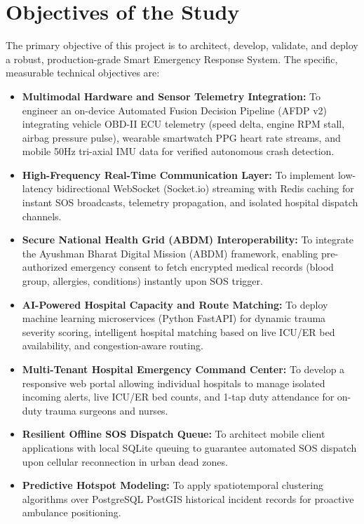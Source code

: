 \documentclass[12pt,a4paper]{article}
\begin{document}
\clearpage
\section{Objectives of the Study}
The primary objective of this project is to architect, develop, validate, and deploy a robust, production-grade Smart Emergency Response System. The specific, measurable technical objectives are:

\begin{itemize}
    \item \textbf{Multimodal Hardware and Sensor Telemetry Integration:} To engineer an on-device Automated Fusion Decision Pipeline (AFDP v2) integrating vehicle OBD-II ECU telemetry (speed delta, engine RPM stall, airbag pressure pulse), wearable smartwatch PPG heart rate streams, and mobile 50Hz tri-axial IMU data for verified autonomous crash detection.
    \item \textbf{High-Frequency Real-Time Communication Layer:} To implement low-latency bidirectional WebSocket (Socket.io) streaming with Redis caching for instant SOS broadcasts, telemetry propagation, and isolated hospital dispatch channels.
    \item \textbf{Secure National Health Grid (ABDM) Interoperability:} To integrate the Ayushman Bharat Digital Mission (ABDM) framework, enabling pre-authorized emergency consent to fetch encrypted medical records (blood group, allergies, conditions) instantly upon SOS trigger.
    \item \textbf{AI-Powered Hospital Capacity and Route Matching:} To deploy machine learning microservices (Python FastAPI) for dynamic trauma severity scoring, intelligent hospital matching based on live ICU/ER bed availability, and congestion-aware routing.
    \item \textbf{Multi-Tenant Hospital Emergency Command Center:} To develop a responsive web portal allowing individual hospitals to manage isolated incoming alerts, live ICU/ER bed counts, and 1-tap duty attendance for on-duty trauma surgeons and nurses.
    \item \textbf{Resilient Offline SOS Dispatch Queue:} To architect mobile client applications with local SQLite queuing to guarantee automated SOS dispatch upon cellular reconnection in urban dead zones.
    \item \textbf{Predictive Hotspot Modeling:} To apply spatiotemporal clustering algorithms over PostgreSQL PostGIS historical incident records for proactive ambulance positioning.
\end{itemize}
\end{document}
